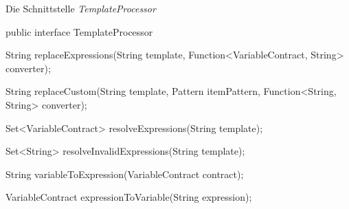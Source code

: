 \begin{program}[h]
\caption{Die Schnittstelle \emph{TemplateProcessor}}
\label{prog:templateProcessor}
\begin{JavaCode}
public interface TemplateProcessor {

    String replaceExpressions(String template,
                              Function<VariableContract, String> converter);

    String replaceCustom(String template,
                         Pattern itemPattern,
                         Function<String, String> converter);

    Set<VariableContract> resolveExpressions(String template);

    Set<String> resolveInvalidExpressions(String template);

    String variableToExpression(VariableContract contract);

    VariableContract expressionToVariable(String expression);
}
\end{JavaCode}
\end{program}

